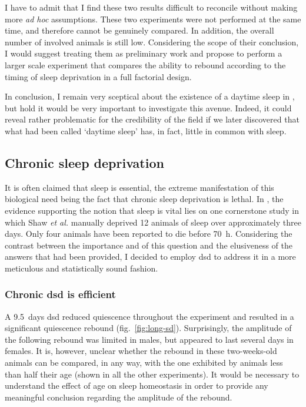 I have to admit that I find these two results difficult to reconcile without making more \emph{ad hoc} assumptions. 
These two experiments were not performed at the same time, and therefore cannot be genuinely compared.
In addition, the overall number of involved animals is still low. 
Considering the scope of their conclusion, I would suggest treating them as preliminary work
and propose to perform a larger scale experiment that compares the ability to 
rebound according to the timing of sleep deprivation in a full factorial design.

In conclusion, I remain very sceptical about the existence of a daytime sleep in \dmel, but hold it would be very important to investigate this avenue.
Indeed, it could reveal rather problematic for the credibility of the field if we later discovered that what had been called `daytime sleep' has, in fact, little in common with sleep.


\subsection{Chronic sleep deprivation}

It is often claimed that sleep is essential, the extreme manifestation of this biological need being the fact that chronic sleep deprivation is lethal\cite{cirelli_is_2008}.
In \droso{}, the evidence supporting the notion that sleep is vital lies on one cornerstone study in which Shaw \emph{et al.} manually deprived 12 animals of sleep over approximately three days\cite{shaw_stress_2002}.
Only four animals have been reported to die before 70~h.
Considering the contrast between the importance and of this question 
and the elusiveness of the answers that had been provided,
I decided to employ \gls{dsd} to address it in a more meticulous and statistically sound fashion.


\subsubsection{Chronic \gls{dsd} is efficient}

A 9.5~days \gls{dsd} reduced quiescence throughout the experiment and resulted in a significant quiescence rebound (fig.~\ref{fig:long-sd}).
Surprisingly, the amplitude of the following rebound was limited in males, but appeared to last several days in females.
It is, however, unclear whether the rebound in these two-weeks-old animals can be compared, in any way,
with the one exhibited by animals less than half their age (shown in all the other experiments).
It would be necessary to understand the effect of age on sleep homeostasis in order to provide any meaningful conclusion regarding the amplitude of the rebound.

